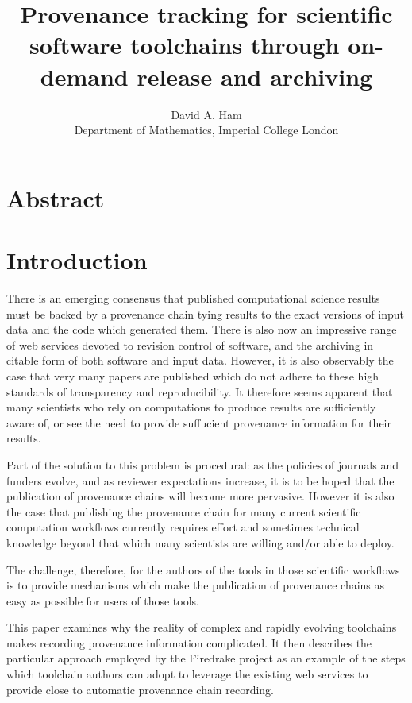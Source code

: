 \documentclass[a4paper,11pt]{article}
\begin{document}
\title{Provenance tracking for scientific software toolchains through on-demand release and archiving}

\author{David A. Ham\\Department of Mathematics, Imperial College London}

\maketitle

\section*{Abstract}

\section{Introduction}

There is an emerging consensus that published computational science results
must be backed by a provenance chain tying results to the exact versions of
input data and the code which generated them. There is also now an
impressive range of web services devoted to revision control of software,
and the archiving in citable form of both software and input data.  However,
it is also observably the case that very many papers are published which do
not adhere to these high standards of transparency and reproducibility. It
therefore seems apparent that many scientists who rely on
computations to produce results are sufficiently aware of, or see the need
to provide suffucient provenance information for their results.

Part of the solution to this problem is procedural: as the policies of
journals and funders evolve, and as reviewer expectations increase, it is to
be hoped that the publication of provenance chains will become more
pervasive. However it is also the case that publishing the provenance chain
for many current scientific computation workflows currently requires effort and
sometimes technical knowledge beyond that which many scientists are willing
and/or able to deploy. 

The challenge, therefore, for the authors of the tools in those scientific
workflows is to provide mechanisms which make the publication of provenance
chains as easy as possible for users of those tools.

This paper examines why the reality of complex and rapidly evolving
toolchains makes recording provenance information complicated. It then
describes the particular approach employed by the Firedrake project as an
example of the steps which toolchain authors can adopt to
leverage the existing web services to provide close to automatic provenance
chain recording.
\end{document}
